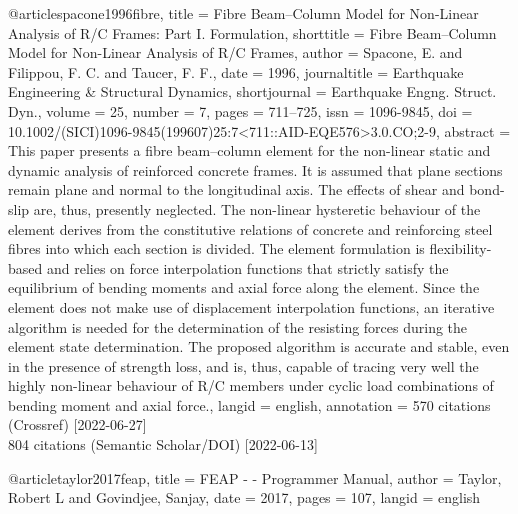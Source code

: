 @article{spacone1996fibre,
  title = {Fibre {{Beam}}–{{Column Model}} for {{Non-Linear Analysis}} of {{R}}/{{C Frames}}: {{Part I}}. {{Formulation}}},
  shorttitle = {Fibre {{Beam}}–{{Column Model}} for {{Non-Linear Analysis}} of {{R}}/{{C Frames}}},
  author = {Spacone, E. and Filippou, F. C. and Taucer, F. F.},
  date = {1996},
  journaltitle = {Earthquake Engineering \& Structural Dynamics},
  shortjournal = {Earthquake Engng. Struct. Dyn.},
  volume = {25},
  number = {7},
  pages = {711--725},
  issn = {1096-9845},
  doi = {10.1002/(SICI)1096-9845(199607)25:7<711::AID-EQE576>3.0.CO;2-9},
  abstract = {This paper presents a fibre beam–column element for the non-linear static and dynamic analysis of reinforced concrete frames. It is assumed that plane sections remain plane and normal to the longitudinal axis. The effects of shear and bond-slip are, thus, presently neglected. The non-linear hysteretic behaviour of the element derives from the constitutive relations of concrete and reinforcing steel fibres into which each section is divided. The element formulation is flexibility-based and relies on force interpolation functions that strictly satisfy the equilibrium of bending moments and axial force along the element. Since the element does not make use of displacement interpolation functions, an iterative algorithm is needed for the determination of the resisting forces during the element state determination. The proposed algorithm is accurate and stable, even in the presence of strength loss, and is, thus, capable of tracing very well the highly non-linear behaviour of R/C members under cyclic load combinations of bending moment and axial force.},
  langid = {english},
  annotation = {570 citations (Crossref) [2022-06-27]\\
804 citations (Semantic Scholar/DOI) [2022-06-13]}
}

@article{taylor2017feap,
  title = {{{FEAP}} - - {{Programmer Manual}}},
  author = {Taylor, Robert L and Govindjee, Sanjay},
  date = {2017},
  pages = {107},
  langid = {english}
}

